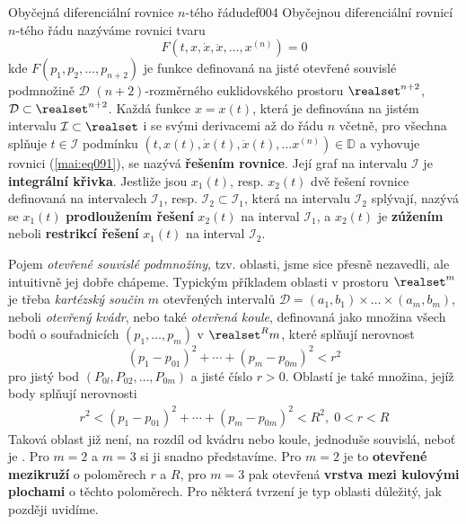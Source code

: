   \begin{mathdef}{Obyčejná diferenciální rovnice \(n\)-tého řádu}{def004}
    Obyčejnou diferenciální rovnicí \(n\)-tého řádu nazýváme rovnici tvaru 
    \begin{equation}\label{mai:eq091}
      F(t, x, \dot{x}, \ddot{x}, \ldots,x^{(n)}) = 0
    \end{equation}
    kde \(F(p_1, p_2, \ldots, p_{n+2})\) je funkce definovaná na jisté otevřené souvislé podmnožině
    \(\mathcal{D}\) \((n+2)\)-rozměrného euklidovského prostoru \(\realset^{n+2}\),
    \(\mathcal{D}\subset \realset^{n+2}\). Každá funkce \(x = x(t)\), která je definována na jistém
    intervalu \(\mathcal{I} \subset\realset\) i se svými derivacemi až do řádu \(n\) včetně, pro
    všechna  splňuje \(t\in\mathcal{I}\) podmínku \((t, x(t), \dot{x}(t), \ddot{x}(t), \ldots
    x^{(n)}) \in\mathbb{D}\) a vyhovuje rovnici (\ref{mai:eq091}), se nazývá \textbf{řešením
    rovnice}. Její graf na intervalu \(\mathcal{I}\) je \textbf{integrální křivka}. Jestliže jsou
    \(x_1(t)\), resp. \(x_2(t)\) dvě řešení rovnice definovaná na intervalech \(\mathcal{I}_1\),
    resp. \(\mathcal{I}_2 \subset \mathcal{I}_1\), která na intervalu \(\mathcal{I}_2\) splývají,
    nazývá se \(x_1(t)\) \textbf{prodloužením řešení} \(x_2(t)\) na interval \(\mathcal{I}_1\), a
    \(x_2(t)\) je \textbf{zúžením} neboli \textbf{restrikcí řešení} \(x_1(t)\) na interval
    \(\mathcal{I}_2\).
  \end{mathdef}
  
  \begin{mdframed}[style=mdnote]     
    Pojem \emph{otevřené souvislé podmnožiny}, tzv. oblasti, jsme sice přesně nezavedli, ale
    intuitivně jej dobře chápeme. Typickým příkladem oblasti v prostoru \(\realset^m\) je třeba
    \emph{kartézský součin} \(m\) otevřených intervalů \(\mathcal{D} = (a_1,b_1) \times\ldots\times
    (a_m, b_m)\), neboli \emph{otevřený kvádr}, nebo také \emph{otevřená koule}, definovaná jako
    množina všech bodů o souřadnicích \((p_1,\ldots, p_m)\) v \(\realset^Rm\), které splňují
    nerovnost 
    \begin{equation*}
      (p_1 - p_{01})^2 + \cdots + (p_m - p_{0m})^2 < r^2
    \end{equation*}
    pro jistý bod \((P_{0l}, P_{02}, \ldots, P_{0m})\) a jisté číslo \(r > 0\). Oblastí je také
    množina, jejíž body splňují nerovnosti
    \begin{gather*}
      r^2 < (p_1 - p_{01})^2 + \cdots + (p_m - p_{0m})^2 < R^2, \; 0 < r < R
    \end{gather*}
    Taková oblast již není, na rozdíl od kvádru nebo koule, jednoduše souvislá, neboť je
    . Pro \(m = 2\) a \(m = 3\) si ji snadno představíme. Pro \(m = 2\) je to
    \textbf{otevřené mezikruží} o poloměrech \(r\) a \(R\), pro \(m = 3\) pak otevřená
    \textbf{vrstva mezi kulovými plochami} o těchto poloměrech. Pro některá tvrzení je typ oblasti
    důležitý, jak později uvidíme. 
  \end{mdframed}

